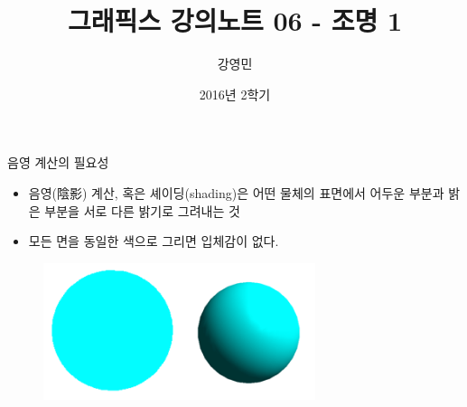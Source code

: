 \documentclass{beamer}
\title[3D 그래픽스 프로그래밍]{그래픽스 강의노트 06 - 조명 1}
\author{강영민}
\institute{동명대학교}
\date{2016년 2학기}
\begin{document}
\begin{frame}
  \titlepage
\end{frame}




%


\begin{frame}[fragile]{음영 계산의 필요성}

\begin{itemize}
\item 음영(陰影) 계산, 혹은 셰이딩(shading)은 어떤 물체의 표면에서 어두운 부분과 밝은 부분을 서로 다른 밝기로 그려내는 것
\item 모든 면을 동일한 색으로 그리면 입체감이 없다.
\end{itemize}

\begin{figure}[h!]
  \centering
    \includegraphics[height=4cm]{OGL_light/shading.png}
\end{figure}

\end{frame}
\end{document}
